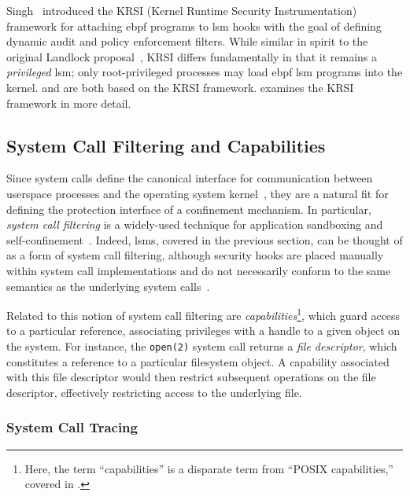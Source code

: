 Singh~\cite{singh2019_krsi} introduced the KRSI (Kernel Runtime Security Instrumentation)
framework for attaching \gls{ebpf} programs to \gls{lsm} hooks with the goal of defining
dynamic audit and policy enforcement filters. While similar in spirit to the original
Landlock proposal~\cite{salaun_landlock_patch}, KRSI differs fundamentally in that it
remains a \textit{privileged} \gls{lsm}; only root-privileged processes may load
\gls{ebpf} \gls{lsm} programs into the kernel. \bpfcontain{} and \bpfbox{} are both based
on the KRSI framework.  examines the KRSI framework in more
detail.




\subsection{System Call Filtering and Capabilities}%
\label{ss:syscall-filtering}

Since system calls define the canonical interface for communication between userspace
processes and the operating system kernel~\cite{jaeger2008_os_security}, they are
a natural fit for defining the protection interface of a confinement mechanism. In
particular, \textit{system call filtering} is a widely-used technique for application
sandboxing and self-confinement~\cite{anderson2017_comparison}. Indeed, \gls{lsm}s,
covered in the previous section, can be thought of as a form of system call filtering,
although security hooks are placed manually within system call implementations and do not
necessarily conform to the same semantics as the underlying system
calls~\cite{wright2002_lsm}.

Related to this notion of system call filtering are \textit{capabilities}\footnote{Here,
the term \enquote{capabilities} is a disparate term from \enquote{POSIX capabilities,} covered in
.}, which guard access to a particular reference, associating privileges with
a handle to a given object on the system. For instance, the \texttt{open(2)} system call
returns a \textit{file descriptor}, which constitutes a reference to a particular
filesystem object. A capability associated with this file descriptor would then restrict
subsequent operations on the file descriptor, effectively restricting access to the
underlying file.

\subsubsection*{System Call Tracing}
\label{sss:ptrace}

